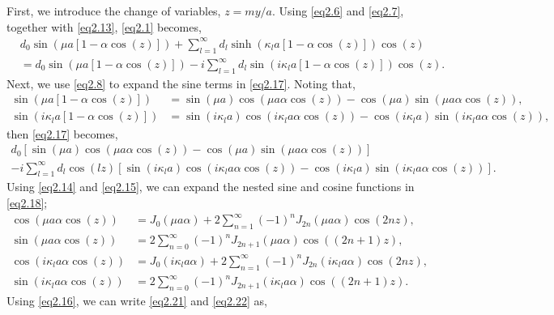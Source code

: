 \documentclass[aip,graphicx]{revtex4-1}
\newcommand{\lr}[1]{\left(#1\right)}
\newcommand{\lrsq}[1]{\left[ #1 \right]}
\newcommand{\besj}[2]{J_{#1}\lr{#2}}
\begin{document}
First, we introduce the change of variables, $z=my/a$.
Using \eqref{eq2.6} and \eqref{eq2.7}, together with \eqref{eq2.13}, \eqref{eq2.1} becomes,
    \begin{align}
     &d_0\sin\lr{\mu a\lrsq{1-\alpha\cos\lr{z}}}+\sum_{l=1}^{\infty}d_l\sinh\lr{\kappa_l a\lrsq{1-\alpha\cos\lr{z}}}\cos\lr{z}\\
     &=d_0\sin\lr{\mu a\lrsq{1-\alpha\cos\lr{z}}}-i\sum_{l=1}^{\infty}d_l\sin\lr{i\kappa_l a\lrsq{1-\alpha\cos\lr{z}}}\cos\lr{z}.\label{eq2.17}
    \end{align}
Next, we use \eqref{eq2.8} to expand the sine terms in \eqref{eq2.17}.
    Noting that,
    \begin{align}
        \sin\lr{\mu a\lrsq{1-\alpha\cos\lr{z}}}&=\sin\lr{\mu a}\cos\lr{\mu a \alpha\cos\lr{z}}-\cos\lr{\mu a}\sin\lr{\mu a\alpha\cos\lr{z}},\\
        \sin\lr{i\kappa_l a\lrsq{1-\alpha\cos\lr{z}}}&=\sin\lr{i\kappa_l a}\cos\lr{i\kappa_l a \alpha\cos\lr{z}}-\cos\lr{i\kappa_l a}\sin\lr{i\kappa_l a\alpha\cos\lr{z}},
    \end{align}
    then \eqref{eq2.17} becomes,
    \begin{multline}
        d_0\lrsq{\sin\lr{\mu a}\cos\lr{\mu a \alpha\cos\lr{z}}-\cos\lr{\mu a}\sin\lr{\mu a\alpha\cos\lr{z}}}\\
        -i\sum_{l=1}^{\infty} d_l\cos\lr{l z}\lrsq{\sin\lr{i\kappa_l a}\cos\lr{i\kappa_l a \alpha\cos\lr{z}}-\cos\lr{i\kappa_l a}\sin\lr{i\kappa_l a\alpha\cos\lr{z}}}.\label{eq2.18}
    \end{multline}
Using \eqref{eq2.14} and \eqref{eq2.15}, we can expand the nested sine and cosine functions in \eqref{eq2.18};
    \begin{align}
        \cos\lr{\mu a\alpha\cos\lr{z}}&=\besj{0}{\mu a \alpha}+2\sum_{n=1}^{\infty}\lr{-1}^n\besj{2n}{\mu a \alpha}\cos\lr{2nz},\label{eq2.19}\\
        \sin\lr{\mu a\alpha\cos\lr{z}}&=2\sum_{n=0}^{\infty}\lr{-1}^n\besj{2n+1}{\mu a \alpha}\cos\lr{\lr{2n+1}z},\label{eq2.20}\\
        \cos\lr{i\kappa_l a \alpha\cos\lr{z}}&=\besj{0}{i\kappa_l a \alpha}+2\sum_{n=1}^{\infty}\lr{-1}^n\besj{2n}{i\kappa_l a \alpha}\cos\lr{2nz},\label{eq2.21}\\
        \sin\lr{i\kappa_l a \alpha\cos\lr{z}}&=2\sum_{n=0}^{\infty}\lr{-1}^n\besj{2n+1}{i\kappa_l a \alpha}\cos\lr{\lr{2n+1}z}.\label{eq2.22}
    \end{align}
Using \eqref{eq2.16}, we can write \eqref{eq2.21} and \eqref{eq2.22} as,
\end{document}

